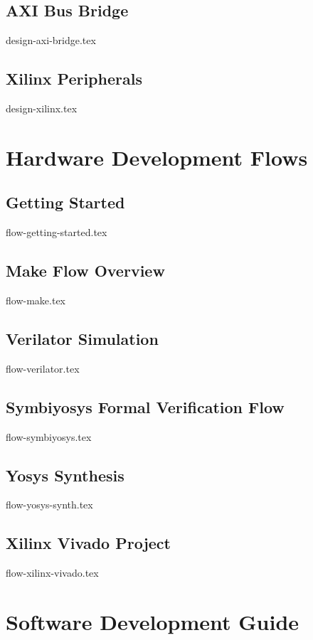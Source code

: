 \documentclass{scarv-report}
\begin{document}
\subsection{AXI Bus Bridge}
\label{sec:design:axi-bridge}
{design-axi-bridge.tex}

\subsection{Xilinx Peripherals}
{design-xilinx.tex}

\section{Hardware Development Flows}
\label{sec:hw-flows}

\subsection{Getting Started}
\label{sec:flow:getting-started}
{flow-getting-started.tex}

\subsection{Make Flow Overview}
{flow-make.tex}

\subsection{Verilator Simulation}
\label{sec:flow:verilator}
{flow-verilator.tex}

\subsection{Symbiyosys Formal Verification Flow}
{flow-symbiyosys.tex}

\subsection{Yosys Synthesis}
{flow-yosys-synth.tex}

\subsection{Xilinx Vivado Project}
{flow-xilinx-vivado.tex}

\section{Software Development Guide}
\label{sec:sw-development}
\end{document}
